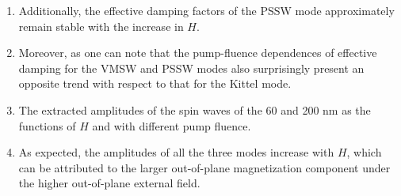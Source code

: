 \begin{enumerate}
    \item Additionally, the effective damping factors of the PSSW mode approximately remain stable with the increase in $H$.
    \item Moreover, as one can note that the pump-fluence dependences of effective damping for the VMSW and PSSW modes also surprisingly present an opposite trend with respect to that for the Kittel mode.
    \item The extracted amplitudes of the spin waves of the 60 and 200 nm as the functions of $H$ and with different pump fluence.
    \item As expected, the amplitudes of all the three modes increase with $H$, which can be attributed to the larger out-of-plane magnetization component under the higher out-of-plane external field.
\end{enumerate}

